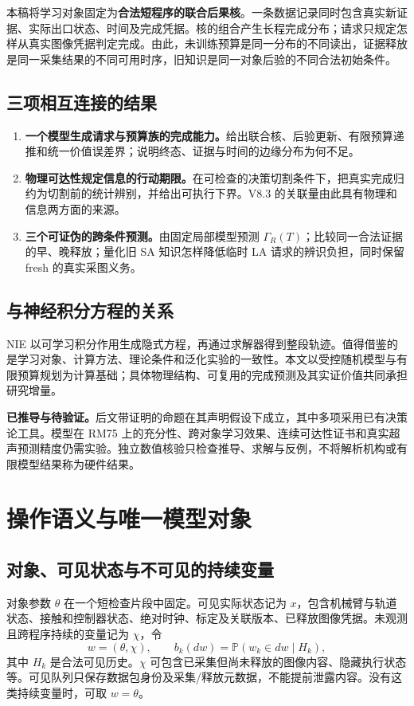 \documentclass[11pt,a4paper,fontset=fandol]{ctexart}
\theoremstyle{definition}
\theoremstyle{remark}
\numberwithin{equation}{section}
\newcommand{\Pp}{\mathbb P}
\begin{document}
本稿将学习对象固定为\textbf{合法短程序的联合后果核}。一条数据记录同时包含真实新证据、实际出口状态、时间及完成凭据。核的组合产生长程完成分布；请求只规定怎样从真实图像凭据判定完成。由此，未训练预算是同一分布的不同读出，证据释放是同一采集结果的不同可用时序，旧知识是同一对象后验的不同合法初始条件。

\subsection{三项相互连接的结果}
\begin{enumerate}
\item \textbf{一个模型生成请求与预算族的完成能力。}给出联合核、后验更新、有限预算递推和统一价值误差界；说明终态、证据与时间的边缘分布为何不足。
\item \textbf{物理可达性规定信息的行动期限。}在可检查的决策切割条件下，把真实完成归约为切割前的统计辨别，并给出可执行下界。V8.3 的关联量由此具有物理和信息两方面的来源。
\item \textbf{三个可证伪的跨条件预测。}由固定局部模型预测 $\Gamma_R(T)$；比较同一合法证据的早、晚释放；量化旧 SA 知识怎样降低临时 LA 请求的辨识负担，同时保留 fresh 的真实采图义务。
\end{enumerate}

\subsection{与神经积分方程的关系}
NIE 以可学习积分作用生成隐式方程，再通过求解器得到整段轨迹\cite{nie}。值得借鉴的是学习对象、计算方法、理论条件和泛化实验的一致性。本文以受控随机模型与有限预算规划为计算基础；具体物理结构、可复用的完成预测及其实证价值共同承担研究增量。

\begin{scopebox}
\textbf{已推导与待验证。}后文带证明的命题在其声明假设下成立，其中多项采用已有决策论工具。模型在 RM75 上的充分性、跨对象学习效果、连续可达性证书和真实超声预测精度仍需实验。独立数值核验只检查推导、求解与反例，不将解析机构或有限模型结果称为硬件结果。
\end{scopebox}

\section{操作语义与唯一模型对象}
\label{sec:model}
\subsection{对象、可见状态与不可见的持续变量}
对象参数 $\theta$ 在一个短检查片段中固定。可见实际状态记为 $x$，包含机械臂与轨道状态、接触和控制器状态、绝对时钟、标定及关联版本、已释放图像凭据。未观测且跨程序持续的变量记为 $\chi$，令
\begin{equation}
 w=(\theta,\chi),\qquad b_k(dw)=\Pp(w_k\in dw\mid H_k),
 \label{eq:hidden}
\end{equation}
其中 $H_k$ 是合法可见历史。$\chi$ 可包含已采集但尚未释放的图像内容、隐藏执行状态等。可见队列只保存数据包身份及采集/释放元数据，不能提前泄露内容。没有这类持续变量时，可取 $w=\theta$。
\end{document}

